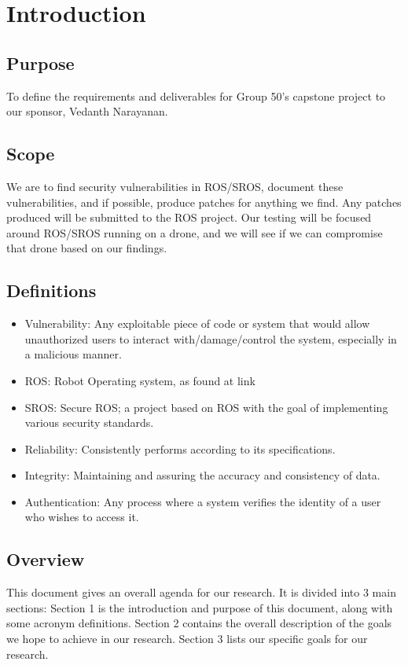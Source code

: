\documentclass{scrreprt}
\begin{document}
\chapter{Introduction}

\section{Purpose}
To define the requirements and deliverables for Group 50's capstone project to our sponsor, Vedanth Narayanan.

\section{Scope}
We are to find security vulnerabilities in ROS/SROS, document these vulnerabilities, and if possible, produce patches for anything we find. Any patches produced will be submitted to the ROS project. Our testing will be focused around ROS/SROS running on a drone, and we will see if we can compromise that drone based on our findings.

\section{Definitions}
\begin{itemize}
  \item Vulnerability: Any exploitable piece of code or system that would allow unauthorized users to interact with/damage/control the system, especially in a malicious manner.
  \item ROS: Robot Operating system, as found at link
  \item SROS: Secure ROS; a project based on ROS with the goal of implementing various security standards.
  \item Reliability: Consistently performs according to its specifications.
  \item Integrity: Maintaining and assuring the accuracy and consistency of data.
  \item Authentication: Any process where a system verifies the identity of a user who wishes to access it.
\end{itemize}

\section{Overview}
This document gives an overall agenda for our research. It is divided into 3 main sections:
Section 1 is the introduction and purpose of this document, along with some acronym definitions.
Section 2 contains the overall description of the goals we hope to achieve in our research.
Section 3 lists our specific goals for our research.
\end{document}
